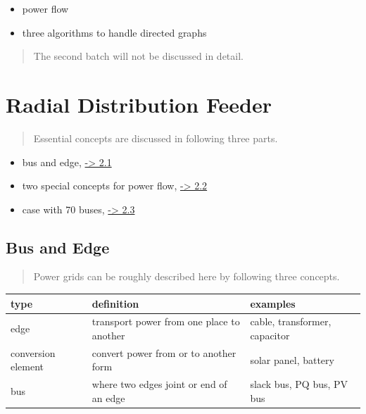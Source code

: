 \documentclass[
]{book}
\providecommand{\tightlist}{%
  \setlength{\itemsep}{0pt}\setlength{\parskip}{0pt}}
\begin{document}
\begin{itemize}
\tightlist
\item
  power flow
\item
  three algorithms to handle directed graphs
\end{itemize}

\begin{quote}
The second batch will not be discussed in detail.
\end{quote}

\hypertarget{radial-distribution-feeder}{%
\chapter{Radial Distribution Feeder}\label{radial-distribution-feeder}}

\begin{quote}
Essential concepts are discussed in following three parts.
\end{quote}

\begin{itemize}
\tightlist
\item
  bus and edge, \protect\hyperlink{bus-edge}{-\textgreater{} 2.1}
\item
  two special concepts for power flow, \protect\hyperlink{concepts}{-\textgreater{} 2.2}
\item
  case with 70 buses, \protect\hyperlink{case}{-\textgreater{} 2.3}
\end{itemize}

\hypertarget{bus-edge}{%
\section{Bus and Edge}\label{bus-edge}}

\begin{quote}
Power grids can be roughly described here by following three concepts.
\end{quote}

\begin{table}[H]
\centering
\begin{tabular}[t]{l|l|l}
\hline
type & definition & examples\\
\hline
edge & transport power from one place to another & cable, transformer, capacitor\\
\hline
conversion element & convert power from or to another form & solar panel, battery\\
\hline
bus & where two edges joint or end of an edge & slack bus, PQ bus, PV bus\\
\hline
\end{tabular}
\end{table}
\end{document}
